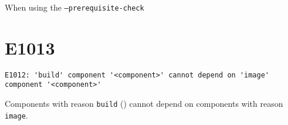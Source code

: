 When using the \texttt{--prerequisite-check}

\section{E1013}
\begin{footnotesize}
\begin{verbatim}
E1012: 'build' component '<component>' cannot depend on 'image' component '<component>'
\end{verbatim}
\end{footnotesize}

Components with reason \texttt{build} () cannot
depend on components with reason \texttt{image}.
